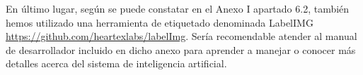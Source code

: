 En último lugar, según se puede constatar en el Anexo I apartado 6.2, también hemos utilizado una herramienta de etiquetado denominada LabelIMG \url{https://github.com/heartexlabs/labelImg}. Sería recomendable atender al manual de desarrollador incluido en dicho anexo para aprender a manejar o conocer más detalles acerca del sistema de inteligencia artificial.


